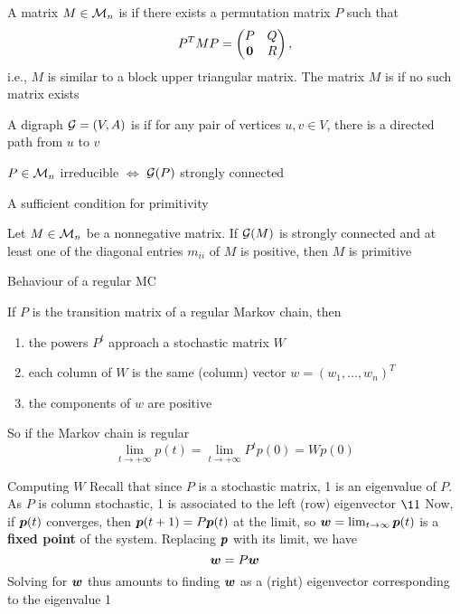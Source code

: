\documentclass[aspectratio=169]{beamer}\usepackage[]{graphicx}\usepackage[]{xcolor}
\begin{document}
\begin{frame}
\begin{definition}
A matrix $M\in\mathcal{M}_n$ is  if there exists a permutation matrix $P$ such that
\[
P^TMP=
\begin{pmatrix}
P & Q \\ \b0 & R
\end{pmatrix},
\]
i.e., $M$ is similar to a block upper triangular matrix. The matrix $M$ is  if no such matrix exists
\end{definition}
\vfill
\begin{definition}
A digraph $\mathcal{G}=(V,A)$ is  if for any pair of vertices $u,v\in V$, there is a directed path from $u$ to $v$
\end{definition}
\vfill
\begin{importanttheorem}
$P\in\mathcal{M}_n$ irreducible $\iff$ $\mathcal{G}(P)$ strongly connected
\end{importanttheorem}
\end{frame}

\begin{frame}{A sufficient condition for primitivity}
\begin{theorem}
Let $M\in\mathcal{M}_n$ be a nonnegative matrix. If $\mathcal{G}(M)$ is strongly connected and at least one of the diagonal entries $m_{ii}$ of $M$ is positive, then $M$ is primitive
\end{theorem}
\end{frame}

\begin{frame}{Behaviour of a regular MC}
\begin{theorem}
If $P$ is the transition matrix of a regular Markov chain, then
\begin{enumerate}
\item the powers $P^t$ approach a stochastic matrix $W$
\item each column of $W$ is the same (column) vector $w=(w_1,\ldots,w_n)^T$
\item the components of $w$ are positive
\end{enumerate}
\end{theorem}
\vfill
So if the Markov chain is regular
\[
\lim_{t\rightarrow +\infty}p(t)=\lim_{t\rightarrow +\infty}P^tp(0)
=Wp(0)
\]
\end{frame}


\begin{frame}{Computing $W$}
Recall that since $P$ is a stochastic matrix, 1 is an eigenvalue of $P$. As $P$ is column stochastic, 1 is associated to the left (row) eigenvector $\11$
\vfill
Now, if $\bm{p}(t)$ converges, then $\bm{p}(t+1)=P\bm{p}(t)$ at the limit, so $\bm{w}=\lim_{t\to\infty}\bm{p}(t)$ is a \textbf{fixed point} of the system. Replacing $\bm{p}$ with its limit, we have
\[
\bm{w}=P\bm{w}
\]
\vfill
Solving for $\bm{w}$ thus amounts to finding $\bm{w}$ as a (right) eigenvector corresponding to the eigenvalue 1
\end{frame}
\end{document}
